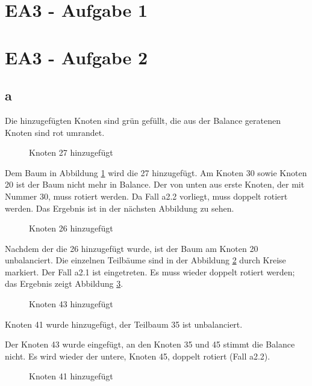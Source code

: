 \documentclass[12pt]{article}
\begin{document}
\section*{EA3 - Aufgabe 1}

\section*{EA3 - Aufgabe 2}

\subsection*{a}
Die hinzugefügten Knoten sind grün gefüllt, die aus der Balance geratenen Knoten sind
rot umrandet.

\begin{figure}[h]
	\centering
	\scalebox{.5}{}
	\caption{Knoten 27 hinzugefügt}
	\label{img:abb1}
\end{figure}

Dem Baum in Abbildung \ref{img:abb1} wird die 27 hinzugefügt. Am Knoten 30 sowie Knoten 20 ist der Baum nicht mehr
in Balance. Der von unten aus erste Knoten, der mit Nummer 30, muss rotiert werden. Da Fall
a2.2 vorliegt, muss doppelt rotiert werden. Das Ergebnis ist in der nächsten Abbildung zu sehen.  


\begin{figure}[h]
	\centering
	\scalebox{.5}{}
	\caption{Knoten 26 hinzugefügt}
	\label{fig:abb2f}
\end{figure}

Nachdem der die 26 hinzugefügt wurde, ist der Baum am Knoten 20 unbalanciert. Die einzelnen
Teilbäume sind in der Abbildung \ref{fig:abb2f} durch Kreise markiert. Der Fall a2.1 ist 
eingetreten. Es muss wieder doppelt rotiert werden; das Ergebnis zeigt Abbildung \ref{fig:abb3b}.

\begin{figure}[h]
	\centering
	\scalebox{.5}{}
	\caption{Knoten 43 hinzugefügt}
	\label{fig:abb3b}
\end{figure}

Knoten 41 wurde hinzugefügt, der Teilbaum 35 ist unbalanciert. 
\newpage

Der Knoten 43 wurde eingefügt, an den Knoten 35 und 45 stimmt die Balance nicht. Es wird wieder
der untere, Knoten 45, doppelt rotiert (Fall a2.2).

\begin{figure}[h]
	\centering
	\scalebox{.5}{}
	\caption{Knoten 41 hinzugefügt}
	\label{fig:abb4b}
\end{figure}
\end{document}
